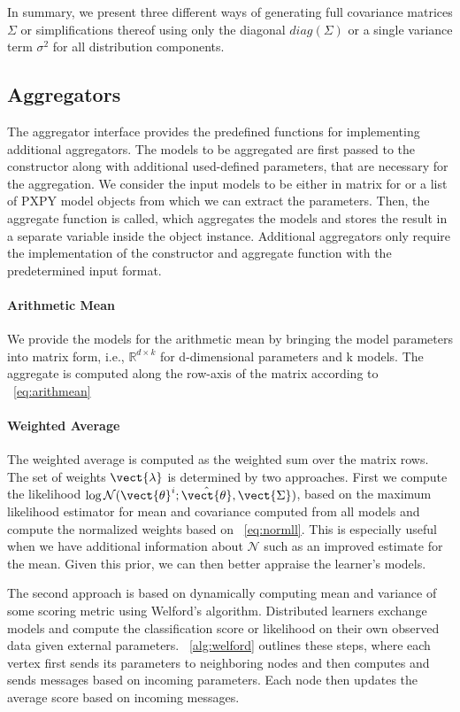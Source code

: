 In summary, we present three different ways of generating full covariance matrices $\Sigma$ or simplifications thereof using only the diagonal $diag(\Sigma)$ or a single variance term $\sigma^2$ for all distribution components.
\subsection{Aggregators}

The aggregator interface provides the predefined functions for implementing additional aggregators.
The models to be aggregated are first passed to the constructor along with additional used-defined parameters, that are necessary for the aggregation.
We consider the input models to be either in matrix for or a list of PXPY model objects from which we can extract the parameters.
Then, the aggregate function is called, which aggregates the models and stores the result in a separate variable inside the object instance.
Additional aggregators only require the implementation of the constructor and aggregate function with the predetermined input format.

\paragraph*{Arithmetic Mean}
We provide the models for the arithmetic mean by bringing the model parameters into matrix form, i.e., $\mathbb{R}^{d \times k}$ for d-dimensional parameters and k models.
The aggregate is computed along the row-axis of the matrix according to \eq~\ref{eq:arithmean}

\paragraph*{Weighted Average}
The weighted average is computed as the weighted sum over the matrix rows.
The set of weights $\vect{\lambda}$ is determined by two approaches.
First we compute the likelihood $\log \mathcal{N}(\vect{\theta}^i; \hat{\vect{\theta}}, \vect{\Sigma})$, based on the maximum likelihood estimator for mean and covariance computed from all models and compute the normalized weights based on \eq~\ref{eq:normll}.
This is especially useful when we have additional information about $\mathcal{N}$ such as an improved estimate for the mean. 
Given this prior, we can then better appraise the learner's models.

The second approach is based on dynamically computing mean and variance of some scoring metric using Welford's algorithm.
Distributed learners exchange models and compute the classification score or likelihood on their own observed data given external parameters.
\alg~\ref{alg:welford} outlines these steps, where each vertex first sends its parameters to neighboring nodes and then computes and sends messages based on incoming parameters. 
Each node then updates the average score based on incoming messages.

